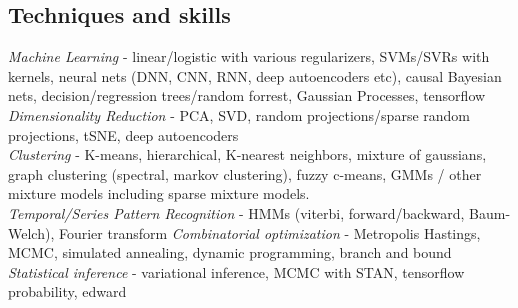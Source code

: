 \documentclass[10pt]{res}
\begin{document}
\begin{resume}
\section{Techniques and skills}
\emph{Machine Learning} - linear/logistic with various regularizers, SVMs/SVRs with kernels, neural nets (DNN, CNN, RNN, deep autoencoders etc), causal Bayesian nets, decision/regression trees/random forrest, Gaussian Processes, tensorflow \\
\emph{Dimensionality Reduction} - PCA, SVD, random projections/sparse random projections, tSNE, deep autoencoders \\
\emph{Clustering} - K-means, hierarchical, K-nearest neighbors, mixture of gaussians, graph clustering (spectral, markov clustering), fuzzy c-means, GMMs / other mixture models including sparse mixture models. \\
\emph{Temporal/Series Pattern Recognition} - HMMs (viterbi, forward/backward, Baum-Welch), Fourier transform
\emph{Combinatorial optimization} - Metropolis Hastings, MCMC, simulated annealing, dynamic programming, branch and bound
\emph{Statistical inference} - variational inference, MCMC with STAN, tensorflow probability, edward
\end{resume} 
\end{document}
